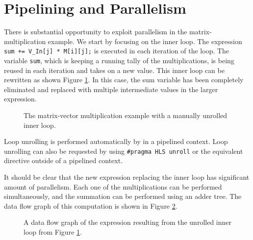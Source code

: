 \section{Pipelining and Parallelism}

There is substantial opportunity to exploit parallelism in the matrix-multiplication example. We start by focusing on the inner loop. The expression \lstinline|sum += V_In[j] * M[i][j];| is executed in each iteration of the loop. The variable \lstinline|sum|, which is keeping a running tally of the multiplications, is being reused in each iteration and takes on a new value. This inner loop can be rewritten as shown Figure \ref{fig:matrix_vector_base_unroll_inner}.  In this case, the sum variable has been completely eliminated and replaced with multiple intermediate values in the larger expression.

\begin{figure}

\caption{The matrix-vector multiplication example with a manually unrolled inner loop.}
\label{fig:matrix_vector_base_unroll_inner}
\end{figure}


\begin{aside}
Loop unrolling is performed automatically by \VHLS in a pipelined context.  Loop unrolling can also be requested by using \lstinline|#pragma HLS unroll| or the equivalent directive outside of a pipelined context.  
\end{aside} 

It should be clear that the new expression replacing the inner loop has significant amount of parallelism. Each one of the multiplications can be performed simultaneously, and the summation can be performed using an adder tree. The data flow graph of this computation is shown in Figure \ref{fig:matrix_vector_unroll_inner_dfg}. 

\begin{figure}
\centering

\caption{A data flow graph of the expression resulting from the unrolled inner loop from Figure \ref{fig:matrix_vector_base_unroll_inner}.}\label{fig:matrix_vector_unroll_inner_dfg}
\end{figure}

